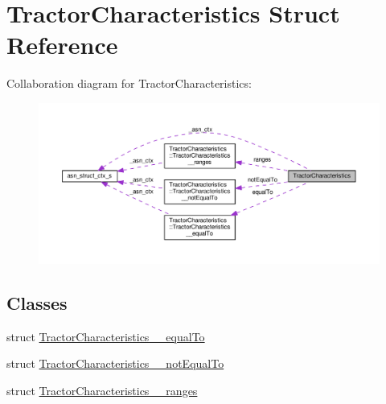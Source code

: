 \hypertarget{structTractorCharacteristics}{}\section{Tractor\+Characteristics Struct Reference}
\label{structTractorCharacteristics}


Collaboration diagram for Tractor\+Characteristics\+:\nopagebreak
\begin{figure}[H]
\begin{center}
\leavevmode
\includegraphics[width=350pt]{structTractorCharacteristics__coll__graph}
\end{center}
\end{figure}
\subsection*{Classes}
\begin{DoxyCompactItemize}
\item 
struct \hyperlink{structTractorCharacteristics_1_1TractorCharacteristics____equalTo}{Tractor\+Characteristics\+\_\+\+\_\+equal\+To}
\item 
struct \hyperlink{structTractorCharacteristics_1_1TractorCharacteristics____notEqualTo}{Tractor\+Characteristics\+\_\+\+\_\+not\+Equal\+To}
\item 
struct \hyperlink{structTractorCharacteristics_1_1TractorCharacteristics____ranges}{Tractor\+Characteristics\+\_\+\+\_\+ranges}
\end{DoxyCompactItemize}

